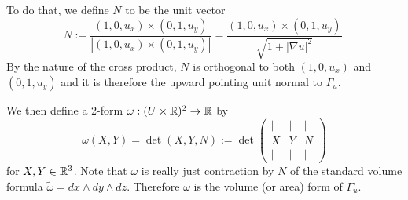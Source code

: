 To do that, we define $N$ to be the unit vector
\[
    N := \frac{(1,0,u_x) \times (0,1,u_y)}{|(1,0,u_x) \times (0,1,u_y)|} = \frac{(1,0,u_x) \times (0,1,u_y)}{\sqrt{1+|\nabla u|^2}}.
\]
By the nature of the cross product, $N$ is orthogonal to both $(1,0,u_x)$ and $(0,1,u_y)$ and it is therefore the upward pointing unit normal to $\Gamma_u$.

We then define a 2-form $\omega:(U \times \mathbb{R})^2 \to \mathbb{R}$ by
\[
    \omega(X,Y) = \det(X,Y,N) := \det\begin{pmatrix}
    | & | & | \\
    X & Y & N \\
    | & | & |
    \end{pmatrix}
\]
for $X,Y \in \mathbb{R}^3$. Note that $\omega$ is really just contraction by $N$ of the standard volume formula $\tilde\omega=dx \wedge dy \wedge dz$.
Therefore $\omega$ is the volume (or area) form of $\Gamma_u$.

